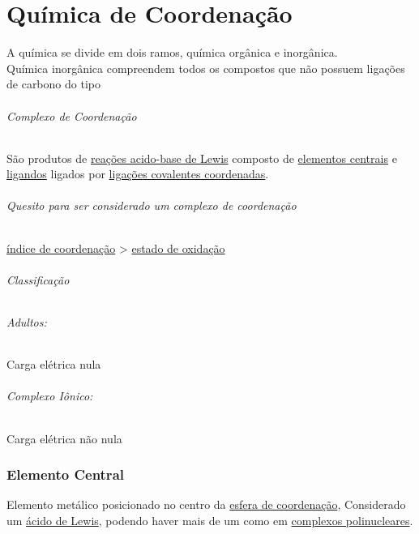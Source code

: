 \documentclass{article}
\begin{document}
\newpage



\part{Química de Coordenação}
\label{quimica de coordenacao}
%
A química se divide em dois ramos, química orgânica e inorgânica.\\
Química inorgânica compreendem todos os compostos que não possuem ligações de carbono do tipo 
%

\paragraph{Complexo de Coordenação}
\label{complexo de coordenacao}
%
São produtos de
\hyperref[Background - lewis]{reações acido-base de Lewis}
composto de 
\hyperref[elemento central]{elementos centrais}
e
\hyperref[ligandos]{ligandos}
ligados por
\hyperref[Background - ligacoes covalentes coordenadas]
	    {ligações covalentes coordenadas}.
%
\paragraph{Quesito para ser considerado um complexo de coordenação}
\begin{center}\large
\hyperref[indice de coordenacao]{índice de coordenação} > \hyperref[estado de oxidacao]{estado de oxidação}
\end{center}
%
\paragraph{Classificação}\phantom{\,}
\begin{multicols}{2}

\paragraph{Adultos:} Carga elétrica nula
\paragraph{Complexo Iônico:} Carga elétrica não nula

\end{multicols}
%

\newpage

\section{Elemento Central}
\label{elemento central}
%
Elemento metálico posicionado no centro da \hyperref[esfera de coordenacao]{esfera de coordenação},
Considerado um \hyperref[Background - lewis]{ácido de Lewis}, podendo haver mais de um como em \hyperref[complexo polinuclear]{complexos polinucleares}.
%
\end{document}
